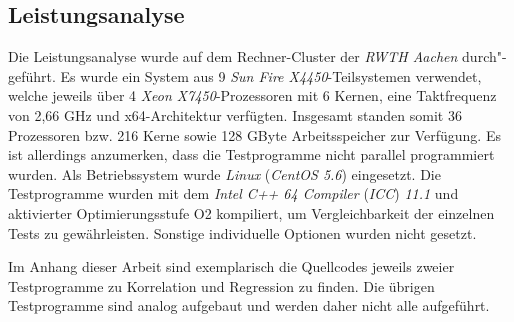 \subsection{Leistungsanalyse}
\label{sec:leistungsanalyse}

Die Leistungsanalyse wurde auf dem Rechner-Cluster der {\it RWTH Aachen} durch"-geführt. Es wurde ein System aus 9 {\it Sun Fire X4450}-Teilsystemen verwendet, welche jeweils über 4 {\it Xeon X7450}-Prozessoren mit 6 Kernen, eine Taktfrequenz von 2,66 GHz und x64-Architektur verfügten. Insgesamt standen somit 36 Prozessoren bzw. 216 Kerne sowie 128 GByte Arbeitsspeicher zur Verfügung. Es ist allerdings anzumerken, dass die Testprogramme nicht parallel programmiert wurden. Als Betriebssystem wurde {\it Linux} ({\it CentOS 5.6}) eingesetzt. Die Testprogramme wurden mit dem {\it Intel C++ 64 Compiler} ({\it ICC}) {\it 11.1} und aktivierter Optimierungsstufe O2 kompiliert, um Vergleichbarkeit der einzelnen Tests zu gewährleisten. Sonstige individuelle Optionen wurden nicht gesetzt.

Im Anhang dieser Arbeit sind exemplarisch die Quellcodes jeweils zweier Testprogramme zu Korrelation und Regression zu finden. Die übrigen Testprogramme sind analog aufgebaut und werden daher nicht alle aufgeführt.


